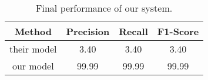 \begin{table}[!htbp]
\centering
\begin{tabular}{|c|c|c|c|}
\hline

Method      &    Precision &     Recall &     F1-Score \\ \hline
their model &     3.40     &      3.40  &      3.40    \\ \hline
our model   &    99.99     &     99.99  &     99.99    \\ \hline


\end{tabular}
\caption{Final performance of our system. }
\label{t:results} 
\end{table}
